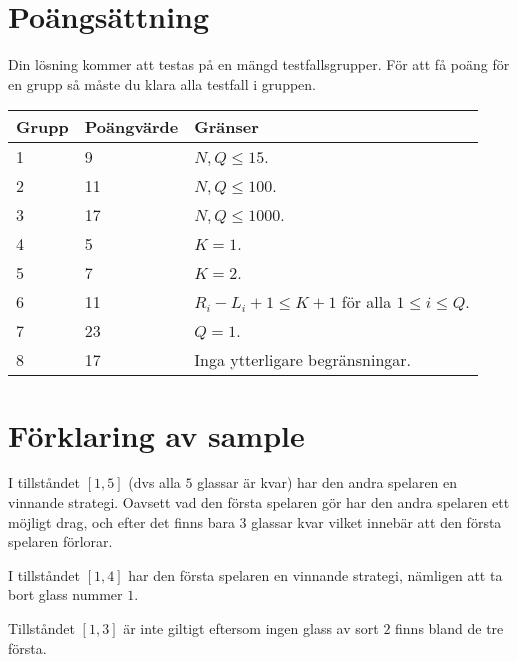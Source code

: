 \section*{Poängsättning}
Din lösning kommer att testas på en mängd testfallsgrupper.
För att få poäng för en grupp så måste du klara alla testfall i gruppen.

\noindent
\begin{tabular}{| l | l | l |}
\hline
Grupp & Poängvärde & Gränser \\ \hline
1     & 9          &  $N,Q \le 15$.\\ \hline
2     & 11         &  $N,Q \le 100$. \\ \hline
3     & 17         &  $N,Q \le 1000$. \\ \hline
4     & 5          &  $K=1$. \\ \hline
5     & 7          &  $K=2$. \\ \hline
6     & 11         &  $R_i - L_i + 1 \le K+1$ för alla $1 \le i \le Q$. \\ \hline
7     & 23         &  $Q=1$. \\ \hline
8     & 17         &  Inga ytterligare begränsningar. \\ \hline
\end{tabular}

\section*{Förklaring av sample}
I tillståndet $[1,5]$ (dvs alla $5$ glassar är kvar) har den andra spelaren en vinnande strategi. 
Oavsett vad den första spelaren gör har den andra spelaren ett möjligt drag, och efter det finns bara $3$ glassar kvar
vilket innebär att den första spelaren förlorar.

I tillståndet $[1,4]$ har den första spelaren en vinnande strategi, nämligen att ta bort glass nummer $1$.

Tillståndet $[1,3]$ är inte giltigt eftersom ingen glass av sort $2$ finns bland de tre första.

